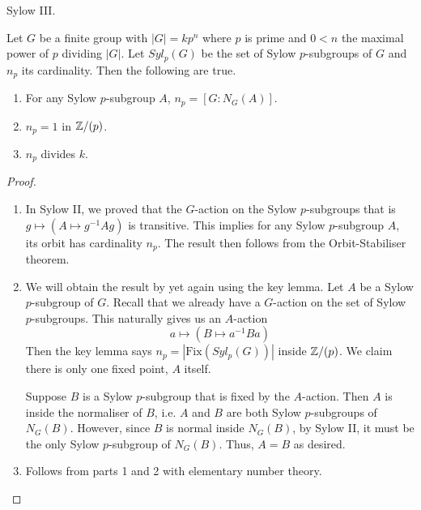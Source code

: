 \documentclass[../../book.tex]{subfiles}
\begin{document}
\begin{thm} Sylow III.
    
    Let $G$ be a finite group with $|G| = k p^n$ where $p$ is prime
    and $0 < n$ the maximal power of $p$ dividing $|G|$. 
    Let $Syl_p(G)$ be the set of Sylow $p$-subgroups of $G$ and $n_p$ its cardinality.
    Then the following are true. \begin{enumerate}
        \item For any Sylow $p$-subgroup $A$, $n_p = [ G : N_G(A)]$.  
        \item $n_p = 1$ in $\mathbb{Z} / (p)$. 
        \item $n_p$ divides $k$. 
    \end{enumerate}
    
\end{thm}
\begin{proof}
    \begin{enumerate}
        \item In Sylow II, we proved that the $G$-action on the Sylow $p$-subgroups
        that is $g \mapsto (A \mapsto g^{-1} A g)$ is transitive. 
        This implies for any Sylow $p$-subgroup $A$, its orbit has cardinality $n_p$.
        The result then follows from the Orbit-Stabiliser theorem. 
        \item We will obtain the result by yet again using the key lemma. 
        Let $A$ be a Sylow $p$-subgroup of $G$. 
        Recall that we already have a $G$-action on the set of Sylow $p$-subgroups.
        This naturally gives us an $A$-action \[
            a \mapsto (B \mapsto a^{-1} B a)
        \]
        Then the key lemma says $n_p = |\mathrm{Fix}(Syl_p(G))|$ inside $\mathbb{Z} / (p)$. 
        We claim there is only one fixed point, $A$ itself. 
     
        Suppose $B$ is a Sylow $p$-subgroup that is fixed by the $A$-action.
        Then $A$ is inside the normaliser of $B$,
        i.e. $A$ and $B$ are both Sylow $p$-subgroups of $N_G(B)$.
        However, since $B$ is normal inside $N_G(B)$, by Sylow II,
        it must be the only Sylow $p$-subgroup of $N_G(B)$. 
        Thus, $A = B$ as desired.
    
        \item Follows from parts 1 and 2 with elementary number theory. 
    \end{enumerate}
\end{proof}
\end{document}
